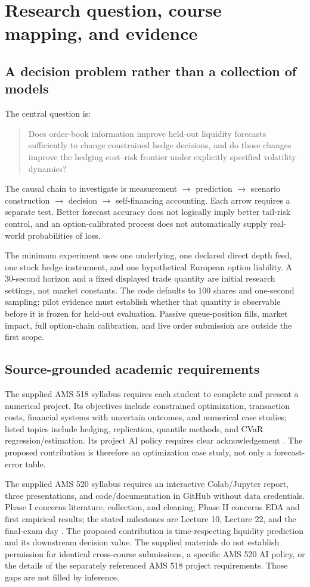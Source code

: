 \section{Research question, course mapping, and evidence}
\subsection{A decision problem rather than a collection of models}
The central question is:
\begin{quote}
Does order-book information improve held-out liquidity forecasts sufficiently to change constrained hedge decisions, and do those changes improve the hedging cost--risk frontier under explicitly specified volatility dynamics?
\end{quote}
The causal chain to investigate is measurement $\rightarrow$ prediction $\rightarrow$ scenario construction $\rightarrow$ decision $\rightarrow$ self-financing accounting. Each arrow requires a separate test. Better forecast accuracy does not logically imply better tail-risk control, and an option-calibrated process does not automatically supply real-world probabilities of loss.

The minimum experiment uses one underlying, one declared direct depth feed, one stock hedge instrument, and one hypothetical European option liability. A 30-second horizon and a fixed displayed trade quantity are initial research settings, not market constants. The code defaults to 100 shares and one-second sampling; pilot evidence must establish whether that quantity is observable before it is frozen for held-out evaluation. Passive queue-position fills, market impact, full option-chain calibration, and live order submission are outside the first scope.

\subsection{Source-grounded academic requirements}
The supplied AMS 518 syllabus requires each student to complete and present a numerical project. Its objectives include constrained optimization, transaction costs, financial systems with uncertain outcomes, and numerical case studies; listed topics include hedging, replication, quantile methods, and CVaR regression/estimation. Its project AI policy requires clear acknowledgement \citep[pp.~2--3]{ams518}. The proposed contribution is therefore an optimization case study, not only a forecast-error table.

The supplied AMS 520 syllabus requires an interactive Colab/Jupyter report, three presentations, and code/documentation in GitHub without data credentials. Phase I concerns literature, collection, and cleaning; Phase II concerns EDA and first empirical results; the stated milestones are Lecture 10, Lecture 22, and the final-exam day \citep[pp.~2--3]{ams520}. The proposed contribution is time-respecting liquidity prediction and its downstream decision value. The supplied materials do not establish permission for identical cross-course submissions, a specific AMS 520 AI policy, or the details of the separately referenced AMS 518 project requirements. Those gaps are not filled by inference.

